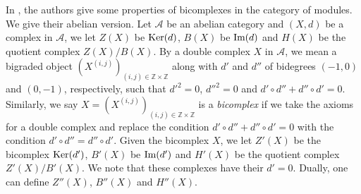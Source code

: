 \documentclass[reqno,12pt]{amsart}
\numberwithin{equation}{section}
\def\Ker{\mbox{\rm Ker}} \def\im{\mbox{\rm Im}} \def\Coker{\mbox{\rm Coker}}\def\mod{\mbox{\rm mod}}
\def\Im{\mbox{\rm Im}} \def\id{\mbox{\rm id}} \def\wid{\mbox{\rm w{\text -}id}} \def\FPid{\mbox{\rm FP{\text -}id}}
\theoremstyle{plain}
\theoremstyle{definition}
\begin{document}
In \cite{EEI12}, the authors give some properties of bicomplexes in the category of modules. We give their abelian version. Let $\mathcal{A}$ be an abelian category and $(X,d)$ be a complex in $\mathcal{A}$, we let $Z(X)$ be $\Ker(d)$, $B(X)$ be $\Im(d)$ and $H(X)$ be the quotient complex $Z(X)/B(X)$. By a double complex $X$ in $\mathcal{A}$, we mean a bigraded object $(X^{(i,j)})_{(i,j)\in \mathbb{Z}\times \mathbb{Z}}$ along with $d'$ and $d''$ of bidegrees $(-1,0)$ and $(0,-1)$, respectively, such that $d'^2=0$, $d''^2=0$ and $d'\circ d''+d''\circ d'=0$. Similarly, we say $X=(X^{(i,j)})_{(i,j)\in \mathbb{Z}\times \mathbb{Z}}$ is a {\it bicomplex} if we take the axioms for a double complex and replace the condition $d'\circ d''+d''\circ d'=0$ with the condition $d'\circ d''=d''\circ d'$. Given the bicomplex $X$, we let $Z'(X)$ be the bicomplex $\Ker(d')$, $B'(X)$ be $\Im(d')$ and $H'(X)$ be the quotient complex $Z'(X)/B'(X)$. We note that these complexes have their $d'=0$. Dually, one can define $Z''(X)$, $B''(X)$ and $H''(X)$.
\end{document}

